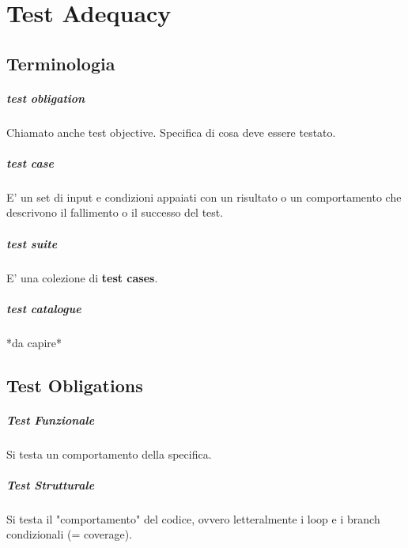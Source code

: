 \chapter{Test Adequacy}

\section{Terminologia}

\paragraph{test obligation}

Chiamato anche test objective. Specifica di cosa deve essere testato.

\paragraph{test case}

E' un set di input e condizioni appaiati con un risultato o un comportamento che descrivono il fallimento o il successo del test.

\paragraph{test suite}

E' una colezione di \textbf{test cases}.

\paragraph{test catalogue}

*da capire*

\section{Test Obligations}

\paragraph{Test Funzionale}

Si testa un comportamento della specifica.

\paragraph{Test Strutturale}

Si testa il "comportamento" del codice, ovvero letteralmente i loop e i branch condizionali (= coverage).

